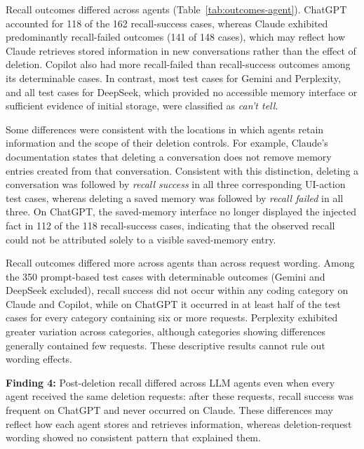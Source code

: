 %
Recall outcomes differed across agents (Table~\ref{tab:outcomes-agent}).
%
ChatGPT accounted for 118 of the 162 recall-success cases, whereas Claude exhibited predominantly recall-failed outcomes (141 of 148 cases), which may reflect how Claude retrieves stored information in new conversations rather than the effect of deletion.
%
Copilot also had more recall-failed than recall-success outcomes among its determinable cases.
%
In contrast, most test cases for Gemini and Perplexity, and all test cases for DeepSeek, which provided no accessible memory interface or sufficient evidence of initial storage, were classified as \textit{can't tell}.

%
Some differences were consistent with the locations in which agents retain information and the scope of their deletion controls.
%
For example, Claude's documentation states that deleting a conversation does not remove memory entries created from that conversation.
%
Consistent with this distinction, deleting a conversation was followed by \textit{recall success} in all three corresponding UI-action test cases, whereas deleting a saved memory was followed by \textit{recall failed} in all three.
%
On ChatGPT, the saved-memory interface no longer displayed the injected fact in 112 of the 118 recall-success cases, indicating that the observed recall could not be attributed solely to a visible saved-memory entry.

%
Recall outcomes differed more across agents than across request wording.
%
Among the 350 prompt-based test cases with determinable outcomes (Gemini and DeepSeek excluded), recall success did not occur within any coding category on Claude and Copilot, while on ChatGPT it occurred in at least half of the test cases for every category containing six or more requests.
%
Perplexity exhibited greater variation across categories, although categories showing differences generally contained few requests.
%
These descriptive results cannot rule out wording effects.

\begin{takeawaybox}
\textbf{Finding 4:} Post-deletion recall differed across LLM agents even when every agent received the same deletion requests: after these requests, recall success was frequent on ChatGPT and never occurred on Claude. These differences may reflect how each agent stores and retrieves information, whereas deletion-request wording showed no consistent pattern that explained them.
\end{takeawaybox}


